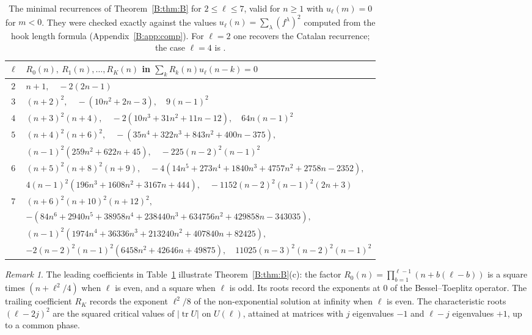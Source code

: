 \documentclass[11pt,a4paper]{article}
\theoremstyle{definition}
\theoremstyle{remark}
\newtheorem{remark}[theorem]{Remark}
\DeclareMathOperator{\tr}{tr}
\numberwithin{equation}{section}
\begin{document}
\begin{table}[ht]
\centering
\renewcommand{\arraystretch}{1.25}
\small
\begin{tabular}{@{}cl@{}}
\toprule
$\ell$ & $R_0(n),\ R_1(n),\dots,R_K(n)$ in $\sum_kR_k(n)u_\ell(n-k)=0$\\
\midrule
$2$ & $n+1,\quad -2(2n-1)$\\
$3$ & $(n+2)^2,\quad -(10n^2+2n-3),\quad 9(n-1)^2$\\
$4$ & $(n+3)^2(n+4),\quad -2(10n^3+31n^2+11n-12),\quad 64n(n-1)^2$\\
$5$ & $(n+4)^2(n+6)^2,\quad -(35n^4+322n^3+843n^2+400n-375),$\\
 & $(n-1)^2(259n^2+622n+45),\quad -225(n-2)^2(n-1)^2$\\
$6$ & $(n+5)^2(n+8)^2(n+9),\quad -4(14n^5+273n^4+1840n^3+4757n^2+2758n-2352),$\\
 & $4(n-1)^2(196n^3+1608n^2+3167n+444),\quad -1152(n-2)^2(n-1)^2(2n+3)$\\
$7$ & $(n+6)^2(n+10)^2(n+12)^2,$\\
 & $-(84n^6+2940n^5+38958n^4+238440n^3+634756n^2+429858n-343035),$\\
 & $(n-1)^2(1974n^4+36336n^3+213240n^2+407840n+82425),$\\
 & $-2(n-2)^2(n-1)^2(6458n^2+42646n+49875),\quad 11025(n-3)^2(n-2)^2(n-1)^2$\\
\bottomrule
\end{tabular}
\medskip
\caption{The minimal recurrences of Theorem~\ref{B:thm:B} for $2\le\ell\le7$, valid for $n\ge1$ with $u_\ell(m)=0$ for $m<0$. They were checked exactly against the values $u_\ell(n)=\sum_\lambda(f^\lambda)^2$ computed from the hook length formula (Appendix~\ref{B:app:comp}). For $\ell=2$ one recovers the Catalan recurrence; the case $\ell=4$ is \cite[(4.7)]{FW26}.}\label{B:tab:perm}
\end{table}

\begin{remark}
The leading coefficients in Table~\ref{B:tab:perm} illustrate Theorem~\ref{B:thm:B}(c): the factor $R_0(n)=\prod_{b=1}^{\ell-1}(n+b(\ell-b))$ is a square times $(n+\ell^2/4)$ when $\ell$ is even, and a square when $\ell$ is odd. Its roots record the exponents at $0$ of the Bessel--Toeplitz operator. The trailing coefficient $R_K$ records the exponent $\ell^2/8$ of the non-exponential solution at infinity when $\ell$ is even. The characteristic roots $(\ell-2j)^2$ are the squared critical values of $|\tr U|$ on $U(\ell)$, attained at matrices with $j$ eigenvalues $-1$ and $\ell-j$ eigenvalues $+1$, up to a common phase.
\end{remark}
\end{document}
